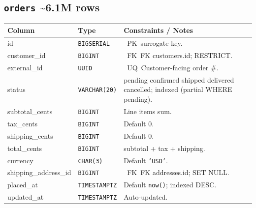 \documentclass[8pt,a4paper]{extarticle}
\newcommand{\pkbadge}{\textcolor{primary}{\faKey}~PK}
\newcommand{\fkbadge}{\textcolor{secondary}{\faKey}~FK}
\newcommand{\uqbadge}{\textcolor{accent}{\faPen}~UQ}
\newcommand{\tttype}[1]{\texttt{#1}}
\newcommand{\tableheader}[2]{\subsection{\texttt{#1} \textcolor{accent}{\textbar{} #2}}}
\begin{document}
\tableheader{orders}{\textasciitilde{}6.1M rows}
\begin{tcolorbox}[schemaframe]
  \renewcommand{\arraystretch}{1.05}
  \begin{tabularx}{\linewidth}{p{2cm} p{1.6cm} X p{2cm}}
    \toprule
    \rowcolor{primary!10}\textbf{Column} & \textbf{Type} & \textbf{Constraints / Notes} \\
    \midrule
    id                  & \tttype{BIGSERIAL}   & \pkbadge\ surrogate key. \\
    customer\_id        & \tttype{BIGINT}      & \fkbadge\ FK \textrightarrow{} customers.id; RESTRICT. \\
    external\_id        & \tttype{UUID}        & \uqbadge\ Customer-facing order \#. \\
    status              & \tttype{VARCHAR(20)} & pending \textbar{} confirmed \textbar{} shipped \textbar{} delivered \textbar{} cancelled; indexed (partial WHERE pending). \\
    subtotal\_cents     & \tttype{BIGINT}      & Line items sum. \\
    tax\_cents          & \tttype{BIGINT}      & Default 0. \\
    shipping\_cents     & \tttype{BIGINT}      & Default 0. \\
    total\_cents        & \tttype{BIGINT}      & subtotal + tax + shipping. \\
    currency            & \tttype{CHAR(3)}     & Default \texttt{`USD'}. \\
    shipping\_address\_id& \tttype{BIGINT}     & \fkbadge\ FK \textrightarrow{} addresses.id; SET NULL. \\
    placed\_at          & \tttype{TIMESTAMPTZ} & Default \texttt{now()}; indexed DESC. \\
    updated\_at         & \tttype{TIMESTAMPTZ} & Auto-updated. \\
    \bottomrule
  \end{tabularx}
\end{tcolorbox}
\end{document}
